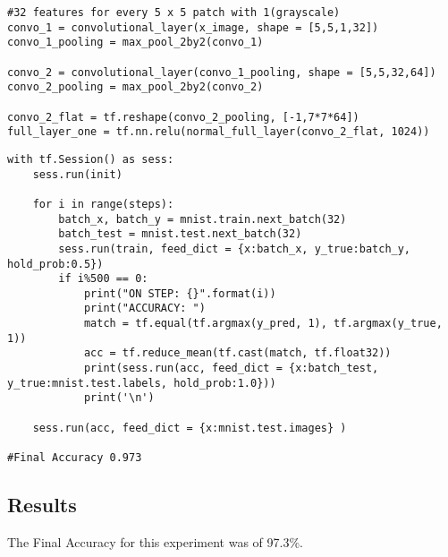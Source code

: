 \begin{lstlisting}[style=Python]
#32 features for every 5 x 5 patch with 1(grayscale)
convo_1 = convolutional_layer(x_image, shape = [5,5,1,32])
convo_1_pooling = max_pool_2by2(convo_1)

convo_2 = convolutional_layer(convo_1_pooling, shape = [5,5,32,64])
convo_2_pooling = max_pool_2by2(convo_2)

convo_2_flat = tf.reshape(convo_2_pooling, [-1,7*7*64])
full_layer_one = tf.nn.relu(normal_full_layer(convo_2_flat, 1024))
\end{lstlisting}

\begin{lstlisting}[style=Python]
with tf.Session() as sess:
    sess.run(init)
    
    for i in range(steps):
        batch_x, batch_y = mnist.train.next_batch(32)
        batch_test = mnist.test.next_batch(32)
        sess.run(train, feed_dict = {x:batch_x, y_true:batch_y, hold_prob:0.5})
        if i%500 == 0:
            print("ON STEP: {}".format(i))
            print("ACCURACY: ")
            match = tf.equal(tf.argmax(y_pred, 1), tf.argmax(y_true, 1))
            acc = tf.reduce_mean(tf.cast(match, tf.float32))
            print(sess.run(acc, feed_dict = {x:batch_test, y_true:mnist.test.labels, hold_prob:1.0}))
            print('\n')
            
    sess.run(acc, feed_dict = {x:mnist.test.images} )

#Final Accuracy 0.973
\end{lstlisting}

\subsection*{Results}
The Final Accuracy for this experiment was of 97.3\%.